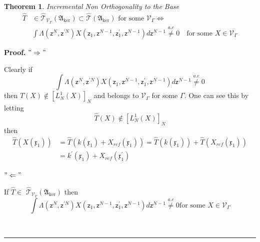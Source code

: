 \documentclass[aps,preprint]{revtex4}%
\newtheorem{theorem}{Theorem}
\newenvironment{proof}[1][Proof]{\noindent\textbf{#1.} }{\ \rule{0.5em}{0.5em}}
\begin{document}
\begin{theorem}
Incremental Non Orthogonality to the Base
\begin{align}
\hat{T}  &  \in\mathcal{\hat{T}}_{\mathcal{V}_{\Gamma}}\left(  \mathfrak{A}%
_{\ker}\right)  \subset\mathcal{\hat{T}}\left(  \mathfrak{A}_{\ker}\right)
\text{ for some }\mathcal{V}_{\Gamma}\Leftrightarrow\nonumber\\
&
{\displaystyle\int}
\Lambda\left(  \mathsf{z}^{N},\mathsf{z}^{\prime N}\right)  X\left(
\mathsf{z}_{1},\mathsf{z}^{N-1},\mathsf{z}_{1}^{\prime},\mathsf{z}%
^{N-1}\right)  d\mathsf{z}^{N-1}\overset{a.e}{\neq}0\quad\text{for some }%
X\in\mathcal{V}_{\Gamma}%
\end{align}

\end{theorem}

\begin{proof}
$"\Rightarrow"$

Clearly if
\begin{equation}%
{\displaystyle\int}
\Lambda\left(  \mathsf{z}^{N},\mathsf{z}^{\prime N}\right)  X\left(
\mathsf{z}_{1},\mathsf{z}^{N-1},\mathsf{z}_{1}^{\prime},\mathsf{z}%
^{N-1}\right)  d\mathsf{z}^{N-1}\overset{a.e}{\neq}0
\end{equation}
then $\hat{T}\left(  X\right)  \notin\left[  L_{N}^{1}\left(  X\right)
\right]  _{N}$ and belongs to $\mathcal{V}_{\Gamma}$ for some $\Gamma$. One
can see this by letting
\begin{equation}
\hat{T}\left(  X\right)  \notin\left[  L_{N}^{1}\left(  X\right)  \right]
_{N}%
\end{equation}
then
\begin{align}
\hat{T}\left(  X\left(  \mathfrak{x}_{1}\right)  \right)   &  =\hat{T}\left(
k\left(  \mathfrak{x}_{1}\right)  +X_{ref}\left(  \mathfrak{x}_{1}\right)
\right)  =\hat{T}\left(  k\left(  \mathfrak{x}_{1}\right)  \right)  +\hat
{T}\left(  X_{ref}\left(  \mathfrak{x}_{1}\right)  \right) \nonumber\\
&  =k^{\prime}\left(  \mathfrak{x}_{1}\right)  +X_{ref}\left(  \mathfrak{x}%
_{1}^{\prime}\right)
\end{align}


$"\Leftarrow"$

If $\hat{T}\in$ $\mathcal{\hat{T}}_{\mathcal{V}_{\Gamma}}\left(
\mathfrak{A}_{\ker}\right)  $ then
\begin{equation}%
{\displaystyle\int}
\Lambda\left(  \mathsf{z}^{N},\mathsf{z}^{\prime N}\right)  X\left(
\mathsf{z}_{1},\mathsf{z}^{N-1},\mathsf{z}_{1}^{\prime},\mathsf{z}%
^{N-1}\right)  d\mathsf{z}^{N-1}\overset{a.e}{\neq}0\text{for some }%
X\in\mathcal{V}_{\Gamma}%
\end{equation}

\end{proof}
\end{document}
